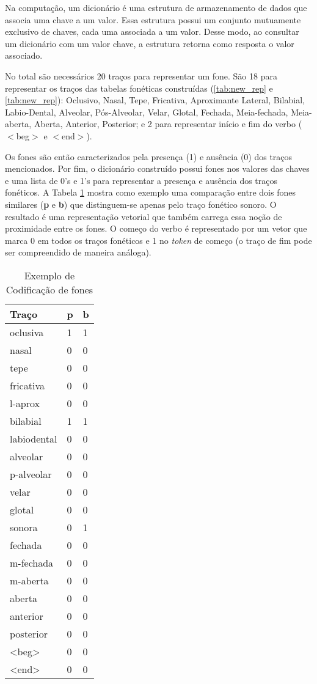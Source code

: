 Na computação, um dicionário é uma estrutura de armazenamento de dados que associa uma chave a um valor. Essa estrutura possui um conjunto mutuamente exclusivo de chaves, cada uma associada a um valor. Desse modo, ao consultar um dicionário com um valor chave, a estrutura retorna como resposta o valor associado.

 No total são necessários 20 traços para representar um fone. São 18 para representar os traços das tabelas fonéticas construídas (\ref{tab:new_rep} e \ref{tab:new_rep}): Oclusivo, Nasal, Tepe, Fricativa, Aproximante Lateral, Bilabial, Labio-Dental, Alveolar, Pós-Alveolar, Velar, Glotal, Fechada, Meia-fechada, Meia-aberta, Aberta, Anterior, Posterior; e 2 para representar início e fim do verbo ($<$beg$>$ e $<$end$>$).

Os fones são então caracterizados pela presença (1) e ausência (0) dos traços mencionados. Por fim, o dicionário construído possui fones nos valores das chaves e uma lista de 0's e 1's para representar a presença e ausência dos traços fonéticos. A Tabela \ref{tab:coding_example} mostra como exemplo uma comparação entre dois fones similares (\textbf{p} e \textbf{b}) que distinguem-se apenas pelo traço fonético sonoro. O resultado é uma representação vetorial que também carrega essa noção de proximidade entre os fones. O começo do verbo é representado por um vetor que marca 0 em todos os traços fonéticos e 1 no \textit{token} de começo (o traço de fim pode ser compreendido de maneira análoga). 

\begin{table}[H]
\begin{center}
\begin{tabular}{lll}
\textbf{ Traço} & \textbf{p} &\textbf{ b} \\
 \toprule
oclusiva & 1 & 1 \\
nasal & 0 & 0 \\
tepe & 0 & 0 \\
fricativa & 0 & 0 \\
l-aprox & 0 & 0 \\
bilabial & 1 & 1 \\
labiodental & 0 & 0 \\
alveolar & 0 & 0 \\
p-alveolar & 0 & 0 \\
velar & 0 & 0 \\
glotal & 0 & 0 \\
sonora & 0 & 1 \\
fechada & 0 & 0 \\
m-fechada & 0 & 0 \\
m-aberta & 0 & 0 \\
aberta & 0 & 0 \\
anterior & 0 & 0 \\
posterior & 0 & 0 \\
<beg> & 0 & 0 \\
<end> & 0 & 0
\end{tabular}
\end{center}
\caption{Exemplo de Codificação de fones}
\label{tab:coding_example}
\end{table}

